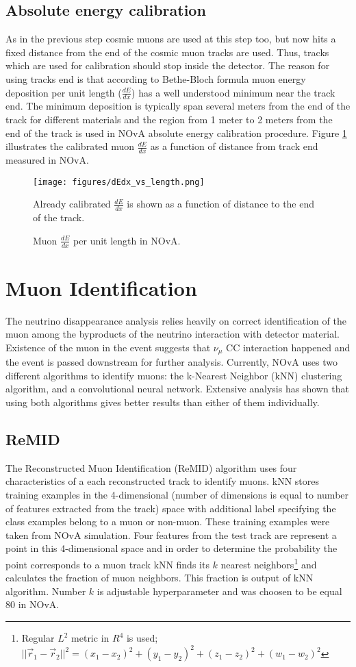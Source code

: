 \subsection{Absolute energy calibration}
As in the previous step cosmic muons are used at this step too, but now hits a fixed distance from the end of the 
cosmic muon tracks are used. Thus, tracks which are used for calibration should stop inside the detector. 
The reason for using tracks end is that according to Bethe-Bloch formula \cite{rpf} muon energy deposition per 
unit length ($\frac{dE}{dx}$) has a well understood minimum near the track end. The minimum deposition is typically
span several meters from the end of the track for different materials and the region from 1 meter to 2 meters from
the end of the track is used in NOvA absolute energy calibration procedure. Figure \ref{fig:dEdx_vs_length} illustrates
the calibrated muon $\frac{dE}{dx}$ as a function of distance from track end measured in NOvA.
\begin{figure}[t]
\texttt{[image: figures/dEdx\_vs\_length.png]}
\caption{Muon $\frac{dE}{dx}$ per unit length in NOvA.}
{Already calibrated $\frac{dE}{dx}$ is shown as a function of distance to the end of the track.}
\label{fig:dEdx_vs_length}
\end{figure}

\section{Muon Identification}
The neutrino disappearance analysis relies heavily on correct identification of the muon among the byproducts of 
the neutrino interaction with detector material. Existence of the muon in the event suggests that $\nu_\mu$ CC interaction
happened and the event is passed downstream for further analysis. Currently, NOvA uses two different algorithms to identify 
muons: the k-Nearest Neighbor (kNN) clustering algorithm, and a convolutional neural network. Extensive analysis 
has shown that using both algorithms gives better results than either of them individually.

\subsection{ReMID}
The Reconstructed Muon Identification (ReMID) algorithm uses four characteristics of a each reconstructed track
to identify muons. kNN stores training examples in the 4-dimensional (number of dimensions
is equal to number of features extracted from the track) space with additional label specifying the class examples
belong to a muon or non-muon. These training examples were taken from NOvA simulation. Four features from the 
test track are represent a point in this 4-dimensional space and in order to determine the probability the point 
corresponds to a muon track kNN finds its $k$ nearest neighbors\footnote{Regular $L^2$ metric in $R^4$ is used;
$||\vec{r}_1 - \vec{r}_2||^2 = (x_1-x_2)^2 + (y_1-y_2)^2 + (z_1-z_2)^2 + (w_1-w_2)^2$} and calculates the 
fraction of muon neighbors. This fraction is output of kNN algorithm. Number $k$ is adjustable hyperparameter 
and was choosen to be equal 80 in NOvA. 

